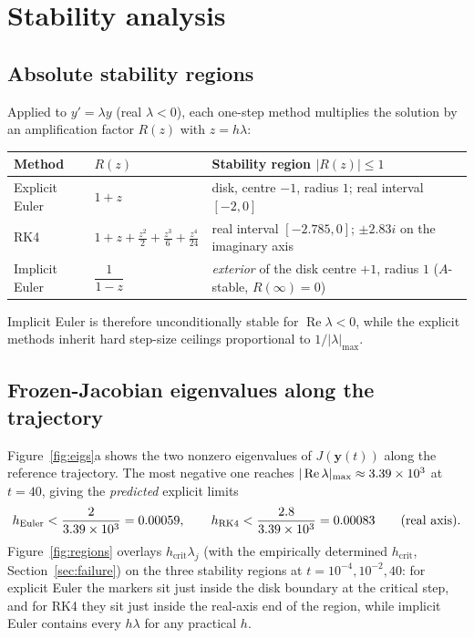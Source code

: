 ﻿\documentclass[11pt,a4paper]{article}
\newcommand{\yy}{\mathbf{y}}
\begin{document}
\section{Stability analysis}\label{sec:stability}
\subsection{Absolute stability regions}
Applied to $y'=\lambda y$ (real $\lambda<0$), each one-step method multiplies
the solution by an amplification factor $R(z)$ with $z=h\lambda$:
\begin{center}
\begin{tabular}{lll}
\toprule
Method & $R(z)$ & Stability region $|R(z)|\le1$ \\
\midrule
Explicit Euler & $1+z$ & disk, centre $-1$, radius $1$; real interval $[-2,0]$\\
RK4 & $1+z+\frac{z^2}{2}+\frac{z^3}{6}+\frac{z^4}{24}$ & real interval $[-2.785,0]$; $\pm2.83 i$ on the imaginary axis\\
Implicit Euler & $\dfrac{1}{1-z}$ & \emph{exterior} of the disk centre $+1$, radius $1$ ($A$-stable, $R(\infty)=0$)\\
\bottomrule
\end{tabular}
\end{center}
Implicit Euler is therefore unconditionally stable for $\operatorname{Re}\lambda<0$,
while the explicit methods inherit hard step-size ceilings proportional to
$1/|\lambda|_{\max}$.

\subsection{Frozen-Jacobian eigenvalues along the trajectory}
Figure~\ref{fig:eigs}a shows the two nonzero eigenvalues of $J(\yy(t))$ along
the reference trajectory.  The most negative one reaches
$|\operatorname{Re}\lambda|_{\max}\approx3.39\times10^{3}$ at $t=40$, giving the
\emph{predicted} explicit limits
\begin{equation}
h_{\text{Euler}} < \frac{2}{3.39\times10^{3}}=0.00059,
\qquad
h_{\text{RK4}} < \frac{2.8}{3.39\times10^{3}}=0.00083
\qquad\text{(real axis).}
\end{equation}
Figure~\ref{fig:regions} overlays $h_{\text{crit}}\lambda_j$ (with the
empirically determined $h_{\text{crit}}$, Section~\ref{sec:failure}) on the
three stability regions at $t=10^{-4},10^{-2},40$: for explicit Euler the
markers sit just inside the disk boundary at the critical step, and for RK4
they sit just inside the real-axis end of the region, while implicit Euler
contains every $h\lambda$ for any practical $h$.
\end{document}

